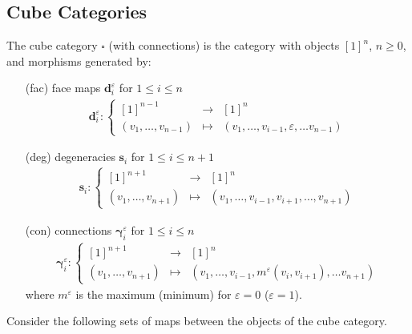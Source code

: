 \documentclass[12pt]{amsart}
\theoremstyle{plain}
\numberwithin{lemma}{\DefaultNumberTheoremWithin}
\numberwithin{claim}{\DefaultNumberTheoremWithin}
\numberwithin{theorem}{\DefaultNumberTheoremWithin}
\numberwithin{corollary}{\DefaultNumberTheoremWithin}
\numberwithin{proposition}{\DefaultNumberTheoremWithin}
\numberwithin{conjecture}{\DefaultNumberTheoremWithin}
\theoremstyle{definition}
\theoremstyle{definition}
\numberwithin{question}{\DefaultNumberTheoremWithin}
\theoremstyle{definition}
\numberwithin{problem}{\DefaultNumberTheoremWithin}
\theoremstyle{remark}
\numberwithin{remark}{\DefaultNumberTheoremWithin}
\theoremstyle{remark}
\numberwithin{example}{\DefaultNumberTheoremWithin}
\def\one{[1]}
\def\ve{\varepsilon}
\def \la{\longrightarrow}
\def \lm{\longmapsto}
\def\bd{\boldsymbol d}
\def\bs{\boldsymbol s}
\def\bg{\boldsymbol\gamma}
\begin{document}
\subsection{Cube Categories} \label{subsec:cubcat}
The cube category $\square$ (with connections) is the category with objects $[1]^n$, $n \geq 0$, and morphisms generated by:
\begin{enumerate}
    \item[(fac)] face maps $\bd_i^\ve$ for $1\leq i \leq n$
    \begin{align*}
        \bd_i^\ve\colon \left\{ \begin{array}{ccc} \one^{n-1}&\la &\one^n  \\
        (v_1,\ldots, v_{n-1})&\lm &(v_1,\ldots,v_{i-1},\varepsilon,\dots v_{n-1})
        \end{array} \right.
    \end{align*}
    \item[(deg)] degeneracies $\bs_i$ for $1\leq i \leq n+1$
    \begin{align*}
        \bs_i\colon \left\{ \begin{array}{ccc} \one^{n+1}&\la &\one^{n}  \\
        (v_1,\ldots,v_{n+1})&\lm &(v_1,\ldots ,v_{i-1},v_{i+1},\ldots,v_{n+1}) \end{array} \right.
    \end{align*}
    \item[(con)] connections $\bg_i^\ve$ for $1\leq i \leq n$
    \begin{align*}
        \bg_i^\ve\colon \left\{ \begin{array}{ccc} \one^{n+1}&\la&\one^{n}  \\
        (v_1,\ldots, v_{n+1})&\lm & (v_1,\ldots,v_{i-1},m^\ve(v_i,v_{i+1}),\ldots v_{n+1})\end{array} \right.
    \end{align*}
    where $m^\ve$ is the maximum (minimum) for $\ve=0$ ($\ve=1$).
   \end{enumerate}

Consider the following sets of maps between the objects of the cube category.
\end{document}
